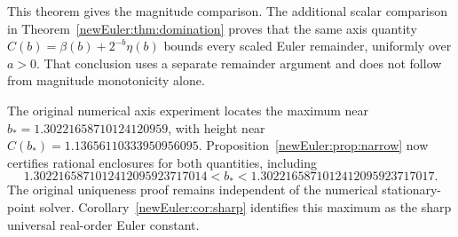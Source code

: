 
This theorem gives the magnitude comparison. The additional scalar
comparison in Theorem~\ref{newEuler:thm:domination} proves that the same
axis quantity $C(b)=\beta(b)+2^{-b}\eta(b)$ bounds every scaled Euler
remainder, uniformly over $a>0$. That conclusion uses a separate
remainder argument and does not follow from magnitude monotonicity alone.

The original numerical axis experiment locates the maximum near
$b_*=1.30221658710124120959$, with height near
$C(b_*)=1.13656110333950956095$. Proposition~\ref{newEuler:prop:narrow}
now certifies rational enclosures for both quantities, including
\[
1.3022165871012412095923717014
<b_*<1.3022165871012412095923717017.
\]
The original uniqueness proof remains independent of the numerical
stationary-point solver. Corollary~\ref{newEuler:cor:sharp} identifies
this maximum as the sharp universal real-order Euler constant.

\caption{Numerical values of the exact Gaussian axis expression and its
stationary-point marker. The shaded interval is the original proved
bracket $1<b_*<2$; the horizontal line is the sharp critical Euler
constant. Proposition~\ref{newEuler:prop:narrow} supplies independent
exact narrow enclosures for the maximizing point and height.
The additional remainder comparison in
Theorem~\ref{newEuler:thm:domination} proves that this larger Gaussian
maximum is also the sharp universal Euler constant for all positive
real orders.}

